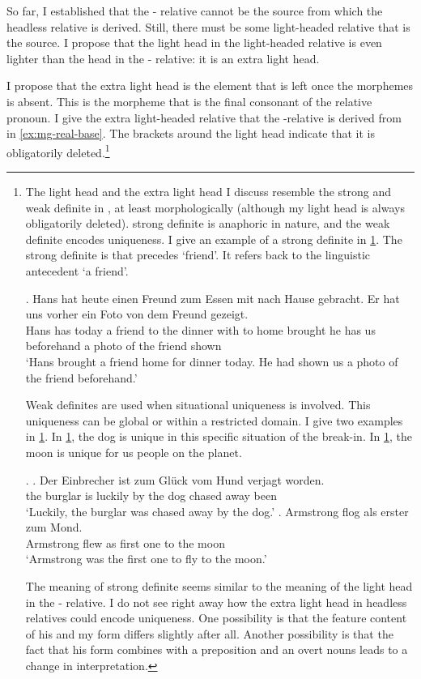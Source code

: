 So far, I established that the - relative cannot be the source from which the headless relative is derived. Still, there must be some light-headed relative that is the source. I propose that the light head in the light-headed relative is even lighter than the head in the - relative: it is an extra light head.

I propose that the extra light head is the element that is left once the morphemes  is absent. This is the morpheme that is the final consonant of the relative pronoun. I give the extra light-headed relative that the -relative is derived from in \ref{ex:mg-real-base}. The brackets around the light head indicate that it is obligatorily deleted.\footnote{
The light head and the extra light head I discuss resemble the strong and weak definite in \citet{schwarz2009}, at least morphologically (although my light head is always obligatorily deleted).  strong definite is anaphoric in nature, and the weak definite encodes uniqueness. I give an example of a strong definite in \ref{ex:mg-florian-strong}. The strong definite is  that precedes  `friend'. It refers back to the linguistic antecedent  `a friend'.

\exg. Hans hat heute einen Freund zum Essen mit nach Hause gebracht. Er hat uns vorher ein Foto von dem Freund gezeigt.\\
Hans has today a friend {to the} dinner with to home brought he has us beforehand a photo of the friend shown\\
`Hans brought a friend home for dinner today. He had shown us a photo of the friend beforehand.'\label{ex:mg-florian-strong}

Weak definites are used when situational uniqueness is involved. This uniqueness can be global or within a restricted domain. I give two examples in \ref{ex:mg-florian-weak}. In \ref{ex:mg-florian-weak-hund}, the dog is unique in this specific situation of the break-in. In \ref{ex:mg-florian-weak-mond}, the moon is unique for us people on the planet.

\ex.\label{ex:mg-florian-weak}
\ag. Der Einbrecher ist {zum Glück} vom Hund verjagt worden.\\
the burglar is luckily {by the} dog {chased away} been\\
`Luckily, the burglar was chased away by the dog.'\label{ex:mg-florian-weak-hund}
\bg. Armstrong flog als erster zum Mond.\\
Armstrong flew as {first one} {to the} moon\\
`Armstrong was the first one to fly to the moon.' \label{ex:mg-florian-weak-mond}

The meaning of  strong definite seems similar to the meaning of the light head in the - relative.
I do not see right away how the extra light head in headless relatives could encode uniqueness. One possibility is that the feature content of his and my form differs slightly after all. Another possibility is that the fact that his form combines with a preposition and an overt nouns leads to a change in interpretation.
}

